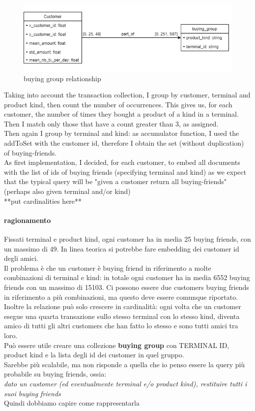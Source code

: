 \documentclass[runningheads]{llncs}
\begin{document}
\begin{figure}[!htb] 
        \centering \includegraphics[width=0.5\columnwidth]{images/buyingFriends_group.png}
        \caption{\label{fig4}buying group relationship}
\end{figure}
Taking into account the transaction collection, I group by customer, terminal and product kind, then count the number of occurrences. This gives us, for each customer, the number of times they bought a product of a kind in a terminal. Then I match only those that have a count greater than 3, as assigned.\\
Then again I group by terminal and kind: as accumulator function, I used the addToSet with the customer id, therefore I obtain the set (without duplication) of buying-friends.\\
As first implementation, I decided, for each customer, to embed all documents with the list of ids of buying friends (specifying terminal and kind) as we expect that the typical query will be "given a customer return all buying-friends" (perhaps also given terminal and/or kind)\\
**put cardinalities here**\\
\paragraph{ragionamento}
Fissati terminal e product kind, ogni customer ha in media 25 buying friends, con un massimo di 49. In linea teorica si potrebbe fare embedding dei customer id degli amici.\\
Il problema è che un customer è buying friend in riferimento a molte combinazioni di terminal e kind: in totale ogni customer ha in media 6552 buying friends con un massimo di 15103. Ci possono essere due customers buying friends in riferimento a più combinazioni, ma questo deve essere comunque riportato.\\
Inoltre la relazione può solo crescere in cardinalità: ogni volta che un customer esegue una quarta transazione sullo stesso terminal con lo stesso kind, diventa amico di tutti gli altri customers che han fatto lo stesso e sono tutti amici tra loro.\\
Può essere utile creare una collezione \textbf{buying group} con TERMINAL ID, product kind e la lista degli id dei customer in quel gruppo.\\
Sarebbe più scalabile, ma non risponde a quella che io penso essere la query più probabile su buying friends, ossia:\\
\textit{dato un customer (ed eventualmente terminal e/o product kind), restituire tutti i suoi buying friends}\\
Quindi dobbiamo capire come rappresentarla
\end{document}
